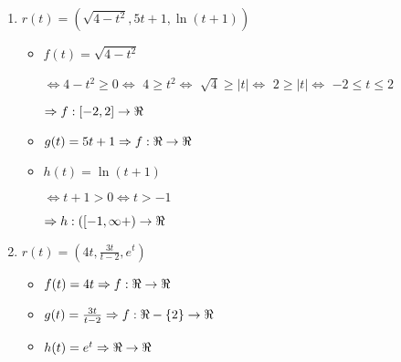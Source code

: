 \documentclass[../practica_02.tex]{subfiles}
\begin{document}
    \begin{enumerate}
        \item $r(t) = (\sqrt{4 - t^2}, 5t+1, \ln(t+1))$
            \begin{itemize}
                \item $f(t) = \sqrt{4 - t^2}$

                    $\Leftrightarrow 4 - t^2 \geq 0 \Leftrightarrow $
                    $ 4 \geq t^2 \Leftrightarrow $
                    $ \sqrt{4} \geq |t| \Leftrightarrow $
                    $ 2 \geq |t| \Leftrightarrow $
                    $ -2 \leq t \leq 2 $

                    $\Rightarrow f: [-2, 2] \rightarrow \real$

                \item $g(t) = 5t + 1 \Rightarrow f: \real \rightarrow \real$
                \item $h(t) = \ln(t+1)$

                    $\Leftrightarrow t + 1 > 0 \Leftrightarrow t > -1$

                    $ \Rightarrow h: ([-1,\infty+) \rightarrow \real $
            \end{itemize}

        \item $r(t) = (4t, \frac{3t}{t-2}, e^t)$
            \begin{itemize}
                \item $f(t) = 4t \Rightarrow f: \real \rightarrow \real$
                \item $g(t) = \frac{3t}{t-2} \Rightarrow f: \real - \{2\} \rightarrow \real$
                \item $h(t) = e^t \Rightarrow \real \rightarrow \real$
            \end{itemize}
    \end{enumerate}
\end{document}
